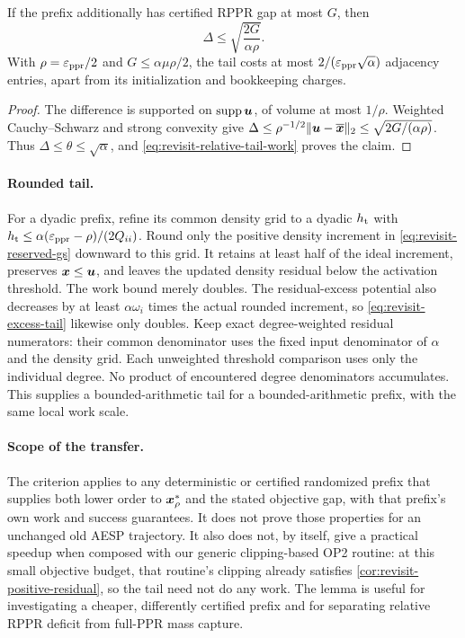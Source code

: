 \begin{corollary}
\label{cor:revisit-relative-gap}
If the prefix additionally has certified RPPR gap at most $G$, then
\[
 \Delta\leq\sqrt{\frac{2G}{\alpha\rho}}.
\]
With $\rho=\varepsilon_{\mathrm{ppr}}/2$ and $G\leq\alpha\mu\rho/2$, the tail costs at
most $2/(\varepsilon_{\mathrm{ppr}}\sqrt\alpha)$ adjacency entries, apart from its
initialization and bookkeeping charges.
\end{corollary}
\begin{proof}
The difference is supported on $\operatorname{supp}\bm{u}$, of volume at most $1/\rho$.
Weighted Cauchy--Schwarz and strong convexity give
$\Delta\leq\rho^{-1/2}\|\bm{u}-\overline{\bm{x}}\|_2
\leq\sqrt{2G/(\alpha\rho)}$.
Thus $\Delta\leq\theta\leq\sqrt\alpha$, and
\cref{eq:revisit-relative-tail-work} proves the claim.
\end{proof}

\paragraph{Rounded tail.}
For a dyadic prefix, refine its common density grid to a dyadic $h_{\rm t}$
with $h_{\rm t}\leq\alpha(\varepsilon_{\mathrm{ppr}}-\rho)/(2Q_{ii})$.
Round only the positive density increment in
\cref{eq:revisit-reserved-gs} downward to this grid. It retains at least
half of the ideal increment, preserves $\bm{x}\leq\bm{u}$, and leaves the
updated density residual below the activation threshold.
The work bound merely doubles. The residual-excess potential also decreases
by at least $\alpha\omega_i$ times the actual rounded increment, so
\cref{eq:revisit-excess-tail} likewise only doubles.
Keep exact degree-weighted residual
numerators: their common denominator uses the fixed input denominator of
$\alpha$ and the density grid. Each unweighted threshold comparison uses
only the individual degree. No product of encountered degree denominators
accumulates. This supplies a bounded-arithmetic tail for a bounded-arithmetic
prefix, with the same local work scale.

\paragraph{Scope of the transfer.}
The criterion applies to any deterministic or certified randomized prefix
that supplies both lower order to $\bm{x}_\rho^*$ and the stated objective
gap, with that prefix's own work and success guarantees. It does not prove
those properties for an unchanged old AESP trajectory.
It also does not, by itself, give a practical speedup when composed with
our generic clipping-based OP2 routine: at this small objective budget,
that routine's clipping already satisfies
\cref{cor:revisit-positive-residual}, so the tail need not do any work.
The lemma is useful for investigating a cheaper, differently certified
prefix and for separating relative RPPR deficit from full-PPR mass capture.

